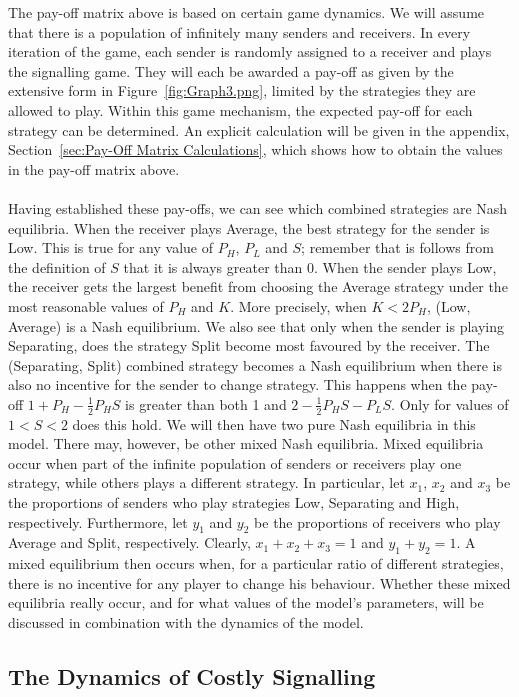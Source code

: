 \documentclass[a4paper,10pt]{article}
\numberwithin{equation}{section}
\begin{document}
The pay-off matrix above is based on certain game dynamics. We will assume that there is a population of infinitely many senders and receivers. In every iteration of the game, each sender is randomly assigned to a receiver and plays the signalling game. They will each be awarded a pay-off as given by the extensive form in Figure~\ref{fig:Graph3.png}, limited by the strategies they are allowed to play. Within this game mechanism, the expected pay-off for each strategy can be determined. An explicit calculation will be given in the appendix, Section~\ref{sec:Pay-Off Matrix Calculations}, which shows how to obtain the values in the pay-off matrix above.\\
\\
Having established these pay-offs, we can see which combined strategies are Nash equilibria. When the receiver plays Average, the best strategy for the sender is Low. This is true for any value of $P_H$, $P_L$ and $S$; remember that is follows from the definition of $S$ that it is always greater than 0. When the sender plays Low, the receiver gets the largest benefit from choosing the Average strategy under the most reasonable values of $P_H$ and $K$. More precisely, when $K<2 P_H$, (Low, Average) is a Nash equilibrium. We also see that only when the sender is playing Separating, does the strategy Split become most favoured by the receiver. The (Separating, Split) combined strategy becomes a Nash equilibrium when there is also no incentive for the sender to change strategy. This happens when the pay-off $1+P_H-\frac{1}{2}P_H S$ is greater than both 1 and $2-\frac{1}{2}P_H S-P_L S$. Only for values of $1<S<2$ does this hold. We will then have two pure Nash equilibria in this model. There may, however, be other mixed Nash equilibria. Mixed equilibria occur when part of the infinite population of senders or receivers play one strategy, while others plays a different strategy. In particular, let $x_1$, $x_2$ and $x_3$ be the proportions of senders who play strategies Low, Separating and High, respectively. Furthermore, let $y_1$ and $y_2$ be the proportions of receivers who play Average and Split, respectively. Clearly, $x_1+x_2+x_3=1$ and $y_1+y_2=1$. A mixed equilibrium then occurs when, for a particular ratio of different strategies, there is no incentive for any player to change his behaviour. Whether these mixed equilibria really occur, and for what values of the model's parameters, will be discussed in combination with the dynamics of the model.

\subsection{The Dynamics of Costly Signalling}
\label{sec:The Dynamics of Costly Signalling}
\end{document}
